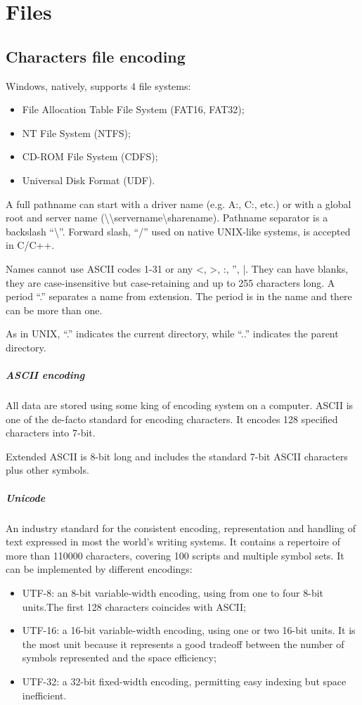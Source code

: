 \chapter{Files}
\section{Characters file encoding}
Windows, natively, supports 4 file systems:
\begin{itemize}
\item File Allocation Table File System (FAT16, FAT32);
\item NT File System (NTFS);
\item CD-ROM File System (CDFS);
\item Universal Disk Format (UDF).
\end{itemize}

A full pathname can start with a driver name (e.g. A:, C:, etc.) or with a global root and server name (\textbackslash\textbackslash servername\textbackslash sharename). Pathname separator is a backslash ``\textbackslash''. Forward slash, ``/'' used on native UNIX-like systems, is accepted in C/C++.

Names cannot use ASCII codes 1-31 or any <, >, :, '', |. They can have blanks, they are case-insensitive but case-retaining and up to 255 characters long. A period ``.'' separates a name from extension. The period is in the name and there can be more than one.

As in UNIX, ``.'' indicates the current directory, while ``..'' indicates the parent directory.

\paragraph{ASCII encoding}
All data are stored using some king of encoding system on a computer. ASCII is one of the de-facto standard for encoding characters. It encodes 128 specified characters into 7-bit.

Extended ASCII is 8-bit long and includes the standard 7-bit ASCII characters plus other symbols.

\paragraph{Unicode}
An industry standard for the consistent encoding, representation and handling of text expressed in most the world's writing systems. It contains a repertoire of more than 110000 characters, covering 100 scripts and multiple symbol sets. It can be implemented by different encodings:
\begin{itemize}
\item UTF-8: an 8-bit variable-width encoding, using from one to four 8-bit units.The first 128 characters coincides with ASCII;
\item UTF-16: a 16-bit variable-width encoding, using one or two 16-bit units. It is the most unit because it represents a good tradeoff between the number of symbols represented and the space efficiency;
\item UTF-32: a 32-bit fixed-width encoding, permitting easy indexing but space inefficient.
\end{itemize}

